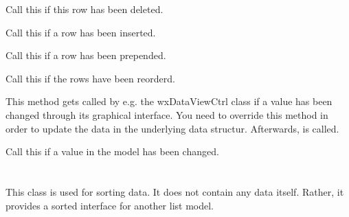 \label{wxdataviewlistmodelrowdeleted}


Call this if this row has been deleted.

\label{wxdataviewlistmodelrowinserted}


Call this if a row has been inserted.

\label{wxdataviewlistmodelrowprepended}


Call this if a row has been prepended.

\label{wxdataviewlistmodelrowsreordered}


Call this if the rows have been reorderd.

\label{wxdataviewlistmodelsetvalue}


This method gets called by e.g. the wxDataViewCtrl class if a 
value has been changed through its graphical interface. You
need to override this method in order to update the data in
the underlying data structur. Afterwards, 
 is called.


\label{wxdataviewlistmodelvaluechanged}


Call this if a value in the model has been changed.


\section{}\label{wxdataviewsortedlistmodel}

This class is used for sorting data. It does not contain any
data itself. Rather, it provides a sorted interface for 
another list model.

